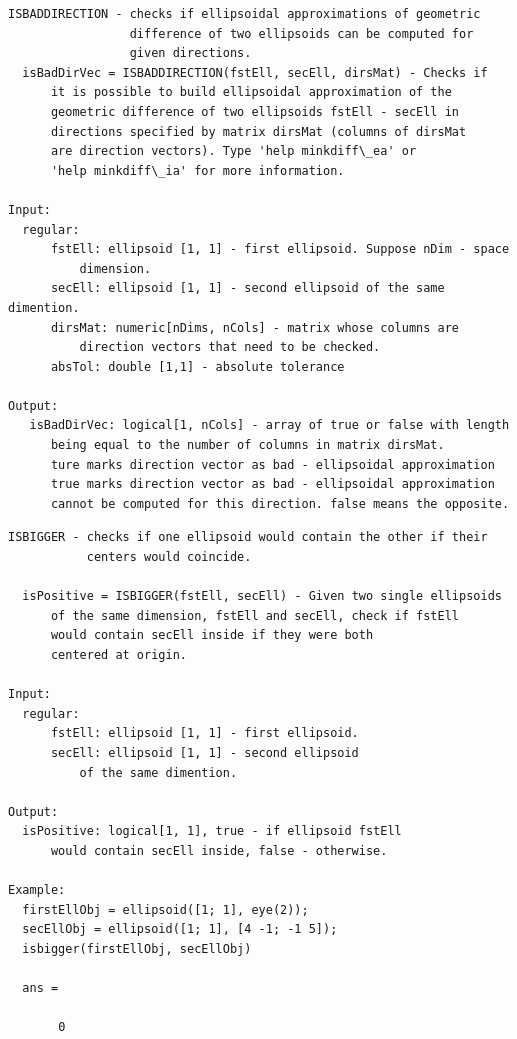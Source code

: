 \documentclass[letterpaper,10pt,english]{sphinxmanual}
\begin{document}
\begin{Verbatim}[commandchars=\\\{\}]
ISBADDIRECTION - checks if ellipsoidal approximations of geometric
                 difference of two ellipsoids can be computed for
                 given directions.
  isBadDirVec = ISBADDIRECTION(fstEll, secEll, dirsMat) - Checks if
      it is possible to build ellipsoidal approximation of the
      geometric difference of two ellipsoids fstEll - secEll in
      directions specified by matrix dirsMat (columns of dirsMat
      are direction vectors). Type 'help minkdiff\_ea' or
      'help minkdiff\_ia' for more information.

Input:
  regular:
      fstEll: ellipsoid [1, 1] - first ellipsoid. Suppose nDim - space
          dimension.
      secEll: ellipsoid [1, 1] - second ellipsoid of the same dimention.
      dirsMat: numeric[nDims, nCols] - matrix whose columns are
          direction vectors that need to be checked.
      absTol: double [1,1] - absolute tolerance

Output:
   isBadDirVec: logical[1, nCols] - array of true or false with length
      being equal to the number of columns in matrix dirsMat.
      ture marks direction vector as bad - ellipsoidal approximation
      true marks direction vector as bad - ellipsoidal approximation
      cannot be computed for this direction. false means the opposite.
\end{Verbatim}

\begin{Verbatim}[commandchars=\\\{\}]
ISBIGGER - checks if one ellipsoid would contain the other if their
           centers would coincide.

  isPositive = ISBIGGER(fstEll, secEll) - Given two single ellipsoids
      of the same dimension, fstEll and secEll, check if fstEll
      would contain secEll inside if they were both
      centered at origin.

Input:
  regular:
      fstEll: ellipsoid [1, 1] - first ellipsoid.
      secEll: ellipsoid [1, 1] - second ellipsoid
          of the same dimention.

Output:
  isPositive: logical[1, 1], true - if ellipsoid fstEll
      would contain secEll inside, false - otherwise.

Example:
  firstEllObj = ellipsoid([1; 1], eye(2));
  secEllObj = ellipsoid([1; 1], [4 -1; -1 5]);
  isbigger(firstEllObj, secEllObj)

  ans =

       0
\end{Verbatim}
\end{document}
